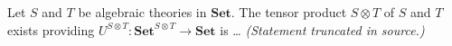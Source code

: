 Let $S$ and $T$ be algebraic theories in $\mathbf{Set}$. The tensor product $S \otimes T$ of $S$ and $T$ exists providing $U^{S \otimes T}: \mathbf{Set}^{S \otimes T} \to \mathbf{Set}$ is \dots
\textit{(Statement truncated in source.)}
